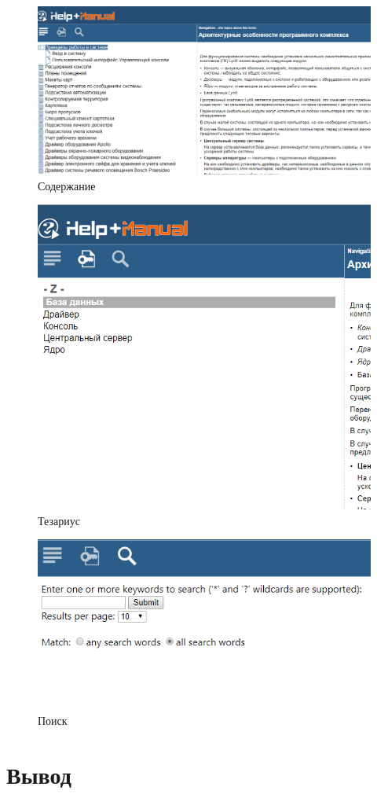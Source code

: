 		\begin{figure}[h]
			\centering
			\includegraphics[width=0.7\linewidth]{images/table-of-content}
			\caption{Содержание}
			\label{fig:table-of-content}
		\end{figure}
		\begin{figure}[h]
			\centering
			\includegraphics[width=0.7\linewidth]{images/ketword-index}
			\caption{Тезариус}
			\label{fig:ketword-index}
		\end{figure}
		\begin{figure}[h]
			\centering
			\includegraphics[width=0.7\linewidth]{images/search}
			\caption{Поиск}
			\label{fig:search}
		\end{figure}
	
		\FloatBarrier
		
		
		
	\section{Вывод}
	
	